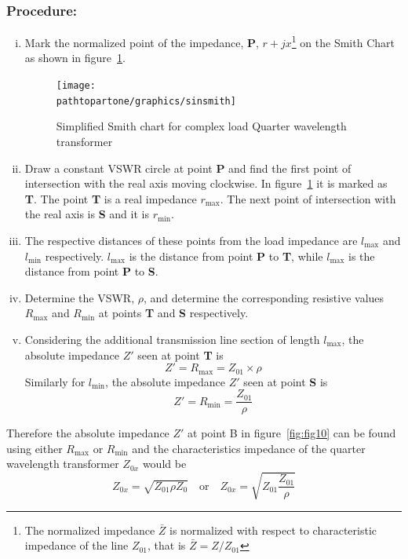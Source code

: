 \subsubsection*{Procedure:}
\begin{enumerate}[(i)]
\item Mark the normalized point of the impedance, \textbf{P}, $r + jx$\footnote{
The normalized impedance $ \bar{Z}$ is normalized with respect to characteristic impedance of the line $ Z_{01}$, that is $ \bar{Z} = Z/ Z_{01}$
} on the Smith Chart as shown in figure~\ref{fig:sinsmith}.
\begin{figure}[h]
\centering
\texttt{[image: \\pathtopartone/graphics/sinsmith]}
\caption{ Simplified Smith chart for complex load Quarter wavelength transformer}
\label{fig:sinsmith}
\end{figure}

\item Draw a constant VSWR circle at point \textbf{P} and find the first point of intersection with the real axis moving clockwise. In figure~\ref{fig:sinsmith} it is marked as \textbf{T}. The point \textbf{T} is a real impedance $r_\max$. The next point of intersection with the real axis is \textbf{S} and it is $r_\min$.
\item The respective distances of these points from the load impedance are $ l_\max$ and $ l_\min$ respectively. $ l_\max$ is the distance from point \textbf{P} to \textbf{T}, while $ l_\max$ is the distance from point \textbf{P} to \textbf{S}.
\item Determine the VSWR, $\rho$, and determine the corresponding resistive values $R_\max$ and $R_\min$ at points \textbf{T} and \textbf{S} respectively. 
\item Considering the additional transmission line section of length $ l_\max$, the absolute impedance $ Z'$ seen at point \textbf{T} is
\begin{equation}
Z' = R_\max = Z_{01}\times\rho
\end{equation}
Similarly for $ l_\min$, the absolute impedance $ Z'$ seen at point \textbf{S} is
\begin{equation}
Z' = R_\min = \frac{Z_{01}}{\rho}
\end{equation}
\end{enumerate}
Therefore the absolute impedance $Z'$ at point B in figure~\ref{fig:fig10} can be found using either $ R_\max$ or $ R_\min$ and the characteristics impedance of the quarter wavelength transformer $Z_{0x}$ would be
\begin{equation*}
Z_{0x}=\sqrt{Z_{01}\rho Z_0}\quad\text{or}\quad Z_{0x}=\sqrt{Z_{01}\frac{Z_{01}}{\rho}}
\end{equation*}

